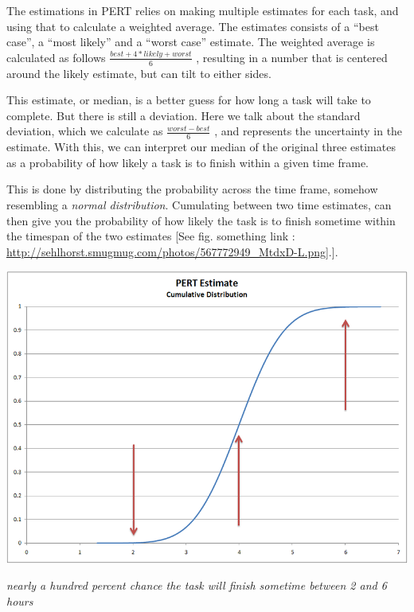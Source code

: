 The estimations in PERT relies on making multiple estimates for each task, and using that to calculate a weighted average. The estimates consists of a ``best case'', a ``most likely'' and a ``worst case'' estimate. The weighted average is calculated as follows
$\frac{best+4*likely+worst}{6}$
, resulting in a number that is centered around the likely estimate, but can tilt to either sides.\
 
This estimate, or median, is a better guess for how long a task will take to complete. But there is still a deviation. Here we talk about the standard deviation, which we calculate as 
$\frac{worst-best}{6}$
, and represents the uncertainty in the estimate. With this, we can interpret our median of the original three estimates as a probability of how likely a task is to finish within a given time frame. \

This is done by distributing the probability across the time frame, somehow resembling a \textit{normal distribution}. Cumulating between two time estimates, can then give you the probability of how likely the task is to finish sometime within the timespan of the two estimates [See fig. something link : \url{http://sehlhorst.smugmug.com/photos/567772949_MtdxD-L.png}].]. \


\begin{center}
\includegraphics[scale=0.5]{PERTDistribution.png} 
\end{center}
\begin{center}
\textit{nearly a hundred percent chance the task will finish sometime between 2 and 6 hours}
\end{center}


